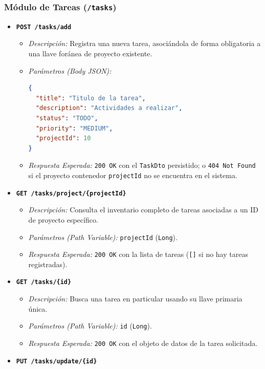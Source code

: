 \documentclass[12pt,a4paper]{article}
\begin{document}
\subsubsection{Módulo de Tareas (\texttt{/tasks})}
\begin{itemize}
    \item \textbf{\texttt{POST /tasks/add}}
    \begin{itemize}
        \item \textit{Descripción:} Registra una nueva tarea, asociándola de forma obligatoria a una llave foránea de proyecto existente.
        \item \textit{Parámetros (Body JSON):}
\begin{lstlisting}[language=json]
{
  "title": "Titulo de la tarea",
  "description": "Actividades a realizar",
  "status": "TODO",
  "priority": "MEDIUM",
  "projectId": 10
}
\end{lstlisting}
        \item \textit{Respuesta Esperada:} \texttt{200 OK} con el \texttt{TaskDto} persistido; o \texttt{404 Not Found} si el proyecto contenedor \texttt{projectId} no se encuentra en el sistema.
    \end{itemize}
    \item \textbf{\texttt{GET /tasks/project/\{projectId\}}}
    \begin{itemize}
        \item \textit{Descripción:} Consulta el inventario completo de tareas asociadas a un ID de proyecto específico.
        \item \textit{Parámetros (Path Variable):} \texttt{projectId} (\texttt{Long}).
        \item \textit{Respuesta Esperada:} \texttt{200 OK} con la lista de tareas (\texttt{[]} si no hay tareas registradas).
    \end{itemize}
    \item \textbf{\texttt{GET /tasks/\{id\}}}
    \begin{itemize}
        \item \textit{Descripción:} Busca una tarea en particular usando su llave primaria única.
        \item \textit{Parámetros (Path Variable):} \texttt{id} (\texttt{Long}).
        \item \textit{Respuesta Esperada:} \texttt{200 OK} con el objeto de datos de la tarea solicitada.
    \end{itemize}
    \item \textbf{\texttt{PUT /tasks/update/\{id\}}}

\end{itemize}
\end{document}
